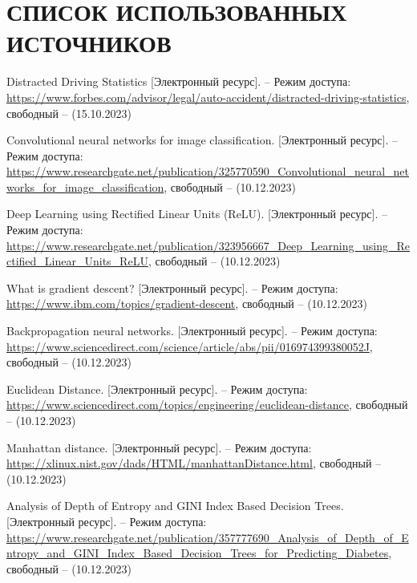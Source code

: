 \section*{СПИСОК ИСПОЛЬЗОВАННЫХ ИСТОЧНИКОВ}

\begingroup
\renewcommand{\section}[2]{}
\begin{thebibliography}{}
	Distracted Driving Statistics [Электронный ресурс]. – Режим доступа: 
	\url{https://www.forbes.com/advisor/legal/auto-accident/distracted-driving-statistics},
	свободный – (15.10.2023)
	
	Convolutional neural networks for image classification. [Электронный ресурс]. – Режим доступа: 
	\url{https://www.researchgate.net/publication/325770590\_Convolutional\_neural\_networks\_for\_image\_classification},
	свободный – (10.12.2023)
	
	Deep Learning using Rectified Linear Units (ReLU). [Электронный ресурс]. – Режим доступа: 
	\url{https://www.researchgate.net/publication/323956667\_Deep\_Learning\_using\_Rectified\_Linear\_Units\_ReLU},
	свободный – (10.12.2023)
	
	What is gradient descent? [Электронный ресурс]. – Режим доступа: 
	\url{https://www.ibm.com/topics/gradient-descent},
	свободный – (10.12.2023)
	
	Backpropagation neural networks. [Электронный ресурс]. – Режим доступа: 
	\url{https://www.sciencedirect.com/science/article/abs/pii/016974399380052J},
	свободный – (10.12.2023)

	Euclidean Distance. [Электронный ресурс]. – Режим доступа: 
	\url{https://www.sciencedirect.com/topics/engineering/euclidean-distance},
	свободный – (10.12.2023)
	
	Manhattan distance. [Электронный ресурс]. – Режим доступа: 
	\url{https://xlinux.nist.gov/dads/HTML/manhattanDistance.html},
	свободный – (10.12.2023)
	
	Analysis of Depth of Entropy and GINI Index Based Decision Trees. [Электронный ресурс]. – Режим доступа: 
	\url{https://www.researchgate.net/publication/357777690\_Analysis\_of\_Depth\_of\_Entropy\_and\_GINI\_Index\_Based\_Decision\_Trees\_for\_Predicting\_Diabetes},
	свободный – (10.12.2023)
\end{thebibliography}
\endgroup

\pagebreak